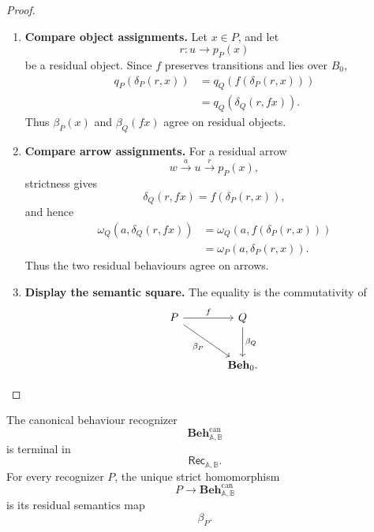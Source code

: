 \begin{proof}
    \leavevmode
    \begin{enumerate}
        \item \textbf{Compare object assignments.}
        Let \(x\in P\), and let
        \[
            r:u\to p_P(x)
        \]
        be a residual object. Since \(f\) preserves transitions and lies over
        \(B_0\),
        \[
        \begin{aligned}
            q_P(\delta_P(r,x))
            &=
            q_Q(f(\delta_P(r,x))) \\
            &=
            q_Q(\delta_Q(r,fx)).
        \end{aligned}
        \]
        Thus \(\beta_P(x)\) and \(\beta_Q(fx)\) agree on residual objects.

        \item \textbf{Compare arrow assignments.}
        For a residual arrow
        \[
            w\xrightarrow{a}u\xrightarrow{r}p_P(x),
        \]
        strictness gives
        \[
            \delta_Q(r,fx)=f(\delta_P(r,x)),
        \]
        and hence
        \[
        \begin{aligned}
            \omega_Q(a,\delta_Q(r,fx))
            &=
            \omega_Q(a,f(\delta_P(r,x))) \\
            &=
            \omega_P(a,\delta_P(r,x)).
        \end{aligned}
        \]
        Thus the two residual behaviours agree on arrows.

        \item \textbf{Display the semantic square.}
        The equality is the commutativity of
        \[
        \begin{tikzcd}[column sep=large, row sep=large]
            P
                \arrow[r, "f"]
                \arrow[dr, "\beta_P"']
            &
            Q
                \arrow[d, "\beta_Q"]
            \\
            &
            \mathbf{Beh}_0 .
        \end{tikzcd}
        \]
    \end{enumerate}
\end{proof}

\begin{theorem}
\label{thm:terminal-recognizer-coeq}
    The canonical behaviour recognizer
    \[
        \mathbf{Beh}^{\mathrm{can}}_{\mathbb A,\mathbb B}
    \]
    is terminal in
    \[
        \mathsf{Rec}_{\mathbb A,\mathbb B}.
    \]
    For every recognizer \(P\), the unique strict homomorphism
    \[
        P\to\mathbf{Beh}^{\mathrm{can}}_{\mathbb A,\mathbb B}
    \]
    is its residual semantics map
    \[
        \beta_P.
    \]
\end{theorem}

